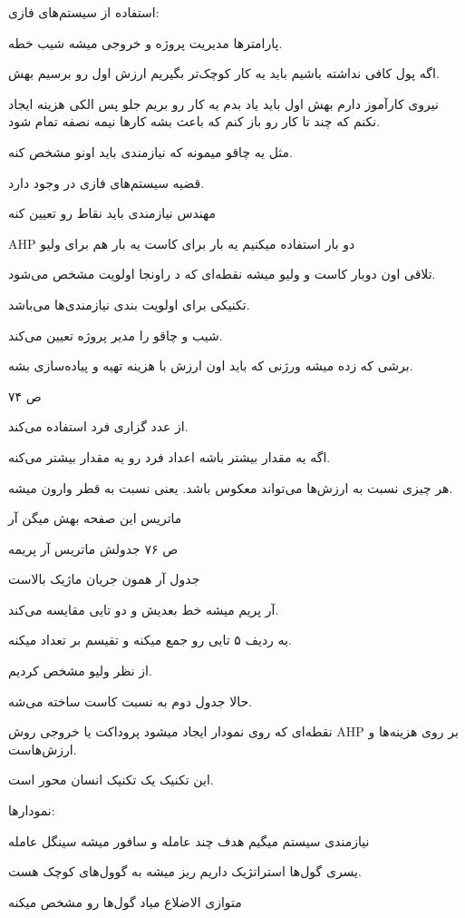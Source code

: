 استفاده از سیستم‌های فازی:

پارامتر‌ها مدیریت پروژه و خروجی میشه شیب خطه.

اگه پول کافی نداشته باشیم باید یه کار کوچک‌تر بگیریم ارزش اول رو برسیم بهش.

نیروی کارآموز دارم بهش اول باید یاد بدم یه کار رو بریم جلو پس الکی هزینه ایجاد
نکنم که چند تا کار رو باز کنم که باعث بشه کار‌ها نیمه نصفه تمام شود.

مثل یه چاقو میمونه که نیازمندی باید اونو مشخص کنه.

قضیه سیستم‌های فازی در  وجود دارد.

مهندس نیازمندی باید نقاط رو تعیین کنه

AHP
دو بار استفاده میکنیم یه بار برای کاست یه بار هم برای ولیو

تلاقی اون دوبار کاست و ولیو میشه نقطه‌ای که د راونجا اولویت مشخص می‌شود.

تکنیکی برای اولویت بندی نیازمندی‌ها می‌باشد.

شیب و چاقو را مدیر پروژه تعیین می‌کند.

برشی که زده میشه ورژنی که باید اون ارزش با هزینه تهیه و پیاده‌سازی بشه.

ص ۷۴

از عدد گزاری فرد استفاده می‌کند.

اگه یه مقدار بیشتر باشه اعداد فرد رو یه مقدار بیشتر می‌کنه.

هر چیزی نسبت به ارزش‌ها می‌تواند معکوس باشد. یعنی نسبت به قطر وارون میشه.

ماتریس این صفحه بهش میگن آر

ص ۷۶ جدولش ماتریس آر پریمه

جدول آر همون جریان ماژیک بالاست

آر پریم میشه خط بعدیش و دو تایی مقایسه می‌کند.

یه ردیف ۵ تایی رو جمع میکنه و تقیسم بر تعداد میکنه.

از نظر ولیو مشخص کردیم.

حالا جدول دوم به نسبت کاست ساخته می‌شه.

نقطه‌ای که روی نمودار ایجاد میشود پروداکت یا خروجی روش AHP بر روی هزینه‌ها و
ارزش‌هاست.

این تکنیک یک تکنیک انسان محور است.

نمودار‌ها:

نیازمندی سیستم میگیم هدف چند عامله
و سافور میشه سینگل عامله

یسری گول‌ها استراتژیک داریم ریز میشه به گوول‌های کوچک هست.

متوازی الاضلاع میاد گول‌ها رو مشخص میکنه

